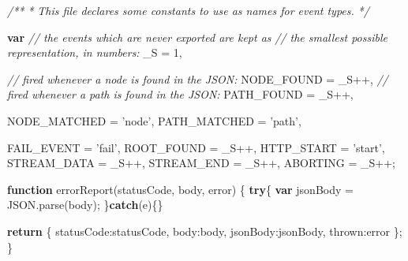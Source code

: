 \documentclass[12pt, ]{article}
\newenvironment{Shaded}{}{}
\newcommand{\KeywordTok}[1]{\textcolor[rgb]{0.00,0.44,0.13}{\textbf{{#1}}}}
\newcommand{\DataTypeTok}[1]{\textcolor[rgb]{0.56,0.13,0.00}{{#1}}}
\newcommand{\DecValTok}[1]{\textcolor[rgb]{0.25,0.63,0.44}{{#1}}}
\newcommand{\StringTok}[1]{\textcolor[rgb]{0.25,0.44,0.63}{{#1}}}
\newcommand{\CommentTok}[1]{\textcolor[rgb]{0.38,0.63,0.69}{\textit{{#1}}}}
\newcommand{\OtherTok}[1]{\textcolor[rgb]{0.00,0.44,0.13}{{#1}}}
\newcommand{\FunctionTok}[1]{\textcolor[rgb]{0.02,0.16,0.49}{{#1}}}
\newcommand{\NormalTok}[1]{{#1}}
\begin{document}
\begin{Shaded}
\begin{Highlighting}[]
\CommentTok{/**}
\CommentTok{ * This file declares some constants to use as names for event types.}
\CommentTok{ */}

\KeywordTok{var} \CommentTok{// the events which are never exported are kept as }
    \CommentTok{// the smallest possible representation, in numbers:}
    \NormalTok{_S = }\DecValTok{1}\NormalTok{,}

    \CommentTok{// fired whenever a node is found in the JSON:}
    \NormalTok{NODE_FOUND    = _S++,}
    \CommentTok{// fired whenever a path is found in the JSON:      }
    \NormalTok{PATH_FOUND    = _S++,   }
    
    \NormalTok{NODE_MATCHED  = }\StringTok{'node'}\NormalTok{,}
    \NormalTok{PATH_MATCHED  = }\StringTok{'path'}\NormalTok{,}
         
    \NormalTok{FAIL_EVENT    = }\StringTok{'fail'}\NormalTok{,    }
    \NormalTok{ROOT_FOUND    = _S++,    }
    \NormalTok{HTTP_START    = }\StringTok{'start'}\NormalTok{,}
    \NormalTok{STREAM_DATA   = _S++,}
    \NormalTok{STREAM_END    = _S++,}
    \NormalTok{ABORTING      = _S++;}
    
\KeywordTok{function} \FunctionTok{errorReport}\NormalTok{(statusCode, body, error) \{}
   \KeywordTok{try}\NormalTok{\{}
      \KeywordTok{var} \NormalTok{jsonBody = }\OtherTok{JSON}\NormalTok{.}\FunctionTok{parse}\NormalTok{(body);}
   \NormalTok{\}}\KeywordTok{catch}\NormalTok{(e)\{\}}

   \KeywordTok{return} \NormalTok{\{}
      \DataTypeTok{statusCode}\NormalTok{:statusCode,}
      \DataTypeTok{body}\NormalTok{:body,}
      \DataTypeTok{jsonBody}\NormalTok{:jsonBody,}
      \DataTypeTok{thrown}\NormalTok{:error}
   \NormalTok{\};}
\NormalTok{\}    }
\end{Highlighting}
\end{Shaded}

\pagebreak


\label{src_functional}
\end{document}
